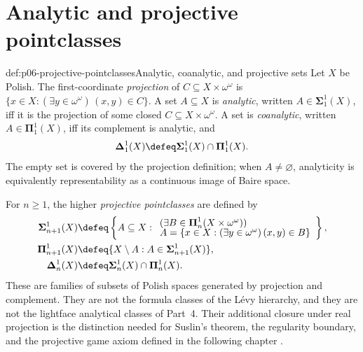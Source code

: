 \section{Analytic and projective pointclasses}
\label{sec:p06-projective-pointclasses}

\begin{hbdefinition}{def:p06-projective-pointclasses}{Analytic, coanalytic, and projective sets}
Let \(X\) be Polish.  The first-coordinate \emph{projection} of
\(C\subseteq X\times\omega^\omega\) is
\(\{x\in X:(\exists y\in\omega^\omega)\,(x,y)\in C\}\).  A set
\(A\subseteq X\) is \emph{analytic}, written
\(A\in\boldsymbol{\Sigma}^{1}_{1}(X)\), iff it is the projection of some
closed \(C\subseteq X\times\omega^\omega\).  A set is \emph{coanalytic}, written
\(A\in\boldsymbol{\Pi}^{1}_{1}(X)\), iff its complement is analytic, and
\[
  \boldsymbol{\Delta}^{1}_{1}(X)
  \defeq
  \boldsymbol{\Sigma}^{1}_{1}(X)
  \cap
  \boldsymbol{\Pi}^{1}_{1}(X).
\]
The empty set is covered by the projection definition; when \(A\ne\varnothing\),
analyticity is equivalently representability as a continuous image of Baire
space.

For \(n\geq1\), the higher \emph{projective pointclasses} are defined by
\[
\begin{aligned}
  \boldsymbol{\Sigma}^{1}_{n+1}(X)
    &\defeq
      \left\{A\subseteq X:
        \begin{array}{l}
        (\exists B\in\boldsymbol{\Pi}^{1}_{n}
          (X\times\omega^\omega))\\[-2pt]
        A=\{x\in X:(\exists y\in\omega^\omega)\,(x,y)\in B\}
        \end{array}\right\},\\
  \boldsymbol{\Pi}^{1}_{n+1}(X)
    &\defeq
      \{X\setminus A:A\in
        \boldsymbol{\Sigma}^{1}_{n+1}(X)\},\\
  \boldsymbol{\Delta}^{1}_{n}(X)
    &\defeq
      \boldsymbol{\Sigma}^{1}_{n}(X)
      \cap\boldsymbol{\Pi}^{1}_{n}(X).
\end{aligned}
\]
These are families of subsets of Polish spaces generated by projection and
complement.  They are not the formula classes of the L\'evy hierarchy, and
they are not the lightface analytical classes of Part~4.  Their additional
closure under real projection is the distinction needed for Suslin's theorem,
the regularity boundary, and the projective game axiom defined in the
following chapter
\cite[Sections~25, 37]{Kechris1995}.
\end{hbdefinition}

